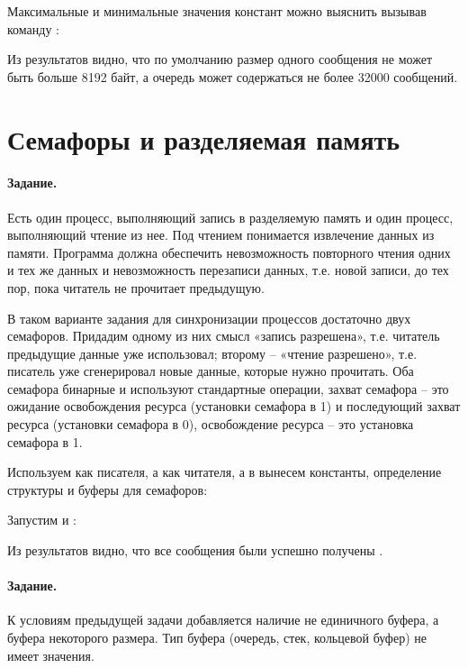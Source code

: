 Максимальные и минимальные значения констант можно выяснить вызывав команду :


Из результатов видно, что по умолчанию размер одного сообщения не может быть больше 8192 байт, а очередь может содержаться не более 32000 сообщений.

\section{Семафоры и разделяемая память}

\paragraph{Задание.} Есть один процесс, выполняющий запись в разделяемую память и один процесс, выполняющий чтение из нее. Под чтением понимается извлечение данных из памяти. Программа должна обеспечить невозможность повторного чтения одних и тех же данных и невозможность перезаписи данных, т.е. новой записи, до тех пор, пока читатель не прочитает предыдущую.

В таком варианте задания для синхронизации процессов достаточно двух семафоров. Придадим одному из них смысл «запись разрешена», т.е. читатель предыдущие данные уже использовал; второму – «чтение разрешено», т.е. писатель уже сгенерировал новые данные, которые нужно прочитать. Оба семафора бинарные и используют стандартные операции, захват семафора – это ожидание освобождения ресурса (установки семафора в 1) и последующий захват ресурса (установки семафора в 0), освобождение ресурса -- это установка семафора в 1.

Используем  как писателя, а  как читателя, а в  вынесем константы, определение структуры  и буферы для семафоров:




Запустим  и :



Из результатов видно, что все сообщения  были успешно получены .

\paragraph{Задание.} К условиям предыдущей задачи добавляется наличие не единичного буфера, а буфера некоторого размера. Тип буфера (очередь, стек, кольцевой буфер) не имеет значения.

